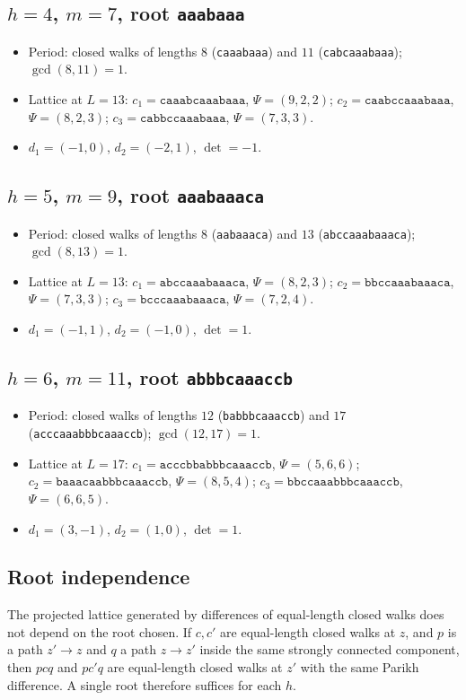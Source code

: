 \subsection*{\texorpdfstring{\(h=4\)}{h=4}, \texorpdfstring{\(m=7\)}{m=7}, root \texttt{aaabaaa}}
\begin{itemize}
\item Period: closed walks of lengths \(8\) (\texttt{caaabaaa}) and \(11\)
      (\texttt{cabcaaabaaa}); \(\gcd(8,11)=1\).
\item Lattice at \(L=13\):
      \(c_1=\texttt{caaabcaaabaaa}\), \(\Psi=(9,2,2)\);
      \(c_2=\texttt{caabccaaabaaa}\), \(\Psi=(8,2,3)\);
      \(c_3=\texttt{cabbccaaabaaa}\), \(\Psi=(7,3,3)\).
\item \(d_1=(-1,0)\), \(d_2=(-2,1)\), \(\det=-1\).
\end{itemize}

\subsection*{\texorpdfstring{\(h=5\)}{h=5}, \texorpdfstring{\(m=9\)}{m=9}, root \texttt{aaabaaaca}}
\begin{itemize}
\item Period: closed walks of lengths \(8\) (\texttt{aabaaaca}) and \(13\)
      (\texttt{abccaaabaaaca}); \(\gcd(8,13)=1\).
\item Lattice at \(L=13\):
      \(c_1=\texttt{abccaaabaaaca}\), \(\Psi=(8,2,3)\);
      \(c_2=\texttt{bbccaaabaaaca}\), \(\Psi=(7,3,3)\);
      \(c_3=\texttt{bcccaaabaaaca}\), \(\Psi=(7,2,4)\).
\item \(d_1=(-1,1)\), \(d_2=(-1,0)\), \(\det=1\).
\end{itemize}

\subsection*{\texorpdfstring{\(h=6\)}{h=6}, \texorpdfstring{\(m=11\)}{m=11}, root \texttt{abbbcaaaccb}}
\begin{itemize}
\item Period: closed walks of lengths \(12\) (\texttt{babbbcaaaccb}) and \(17\)
      (\texttt{acccaaabbbcaaaccb}); \(\gcd(12,17)=1\).
\item Lattice at \(L=17\):
      \(c_1=\texttt{acccbbabbbcaaaccb}\), \(\Psi=(5,6,6)\);
      \(c_2=\texttt{baaacaabbbcaaaccb}\), \(\Psi=(8,5,4)\);
      \(c_3=\texttt{bbccaaabbbcaaaccb}\), \(\Psi=(6,6,5)\).
\item \(d_1=(3,-1)\), \(d_2=(1,0)\), \(\det=1\).
\end{itemize}

\subsection*{Root independence}

The projected lattice generated by differences of equal-length closed walks
does not depend on the root chosen. If \(c,c'\) are equal-length closed walks
at \(z\), and \(p\) is a path \(z'\to z\) and \(q\) a path \(z\to z'\) inside
the same strongly connected component, then \(pcq\) and \(pc'q\) are
equal-length closed walks at \(z'\) with the same Parikh difference. A single
root therefore suffices for each \(h\).
